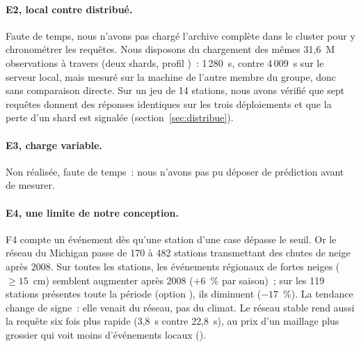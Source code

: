 \paragraph{E2, local contre distribué.} Faute de temps, nous n'avons pas chargé l'archive complète dans le cluster pour y chronométrer les requêtes. Nous disposons du chargement des mêmes 31,6~M observations à travers  (deux shards, profil )~: 1\,280~s, contre 4\,009~s sur le serveur local, mais mesuré sur la machine de l'autre membre du groupe, donc sans comparaison directe. Sur un jeu de 14 stations, nous avons vérifié que sept requêtes donnent des réponses identiques sur les trois déploiements et que la perte d'un shard est signalée (section~\ref{sec:distribue}).

\paragraph{E3, charge variable.} Non réalisée, faute de temps~: nous n'avons pas pu déposer de prédiction avant de mesurer.

\paragraph{E4, une limite de notre conception.} F4 compte un événement dès qu'une station d'une case dépasse le seuil. Or le réseau du Michigan passe de 170 à 482 stations transmettant des chutes de neige après 2008. Sur toutes les stations, les événements régionaux de fortes neiges ($\geq 15$~cm) semblent augmenter après 2008 ($+6$~\% par saison)~; sur les 119 stations présentes toute la période (option ), ils diminuent ($-17$~\%). La tendance change de signe~: elle venait du réseau, pas du climat. Le réseau stable rend aussi la requête six fois plus rapide (3,8~s contre 22,8~s), au prix d'un maillage plus grossier qui voit moins d'événements locaux ().
